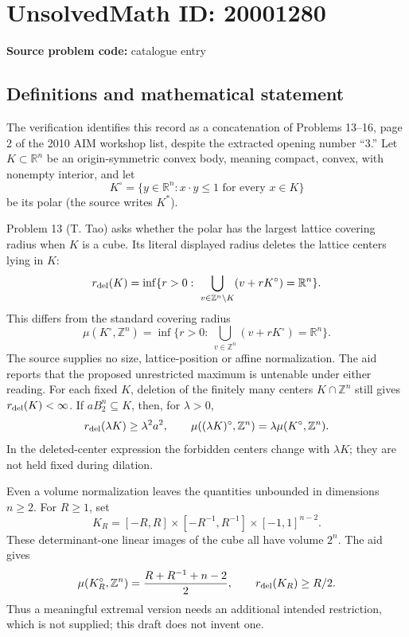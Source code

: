 \documentclass[11pt]{article}
\newcommand{\Z}{\mathbb{Z}}
\newcommand{\R}{\mathbb{R}}
\begin{document}
\section*{UnsolvedMath ID: 20001280}
\textbf{Source problem code:} catalogue entry
\subsection{Definitions and mathematical statement}
The verification identifies this record as a concatenation of Problems 13--16, page 2 of the 2010 AIM workshop list, despite the extracted opening number ``3.'' Let \(K\subset\R^n\) be an origin-symmetric convex body, meaning compact, convex, with nonempty interior, and let
\[
K^\circ=\{y\in\R^n:x\cdot y\le1\text{ for every }x\in K\}
\]
be its polar (the source writes \(K^*\)).

Problem 13 (T. Tao) asks whether the polar has the largest lattice covering radius when \(K\) is a cube. Its literal displayed radius deletes the lattice centers lying in \(K\):
\[
r_{\rm del}(K)=\inf\{r>0:\ \bigcup_{v\in\Z^n\setminus K}(v+rK^\circ)=\R^n\}.
\]
This differs from the standard covering radius
\[
\mu(K^\circ,\Z^n)=\inf\{r>0:\ \bigcup_{v\in\Z^n}(v+rK^\circ)=\R^n\}.
\]
The source supplies no size, lattice-position or affine normalization. The aid reports that the proposed unrestricted maximum is untenable under either reading. For each fixed \(K\), deletion of the finitely many centers \(K\cap\Z^n\) still gives \(r_{\rm del}(K)<\infty\). If \(aB_2^n\subseteq K\), then, for \(\lambda>0\),
\[
r_{\rm del}(\lambda K)\ge\lambda^2a^2,
\qquad
\mu((\lambda K)^\circ,\Z^n)=\lambda\mu(K^\circ,\Z^n).
\]
In the deleted-center expression the forbidden centers change with \(\lambda K\); they are not held fixed during dilation.

Even a volume normalization leaves the quantities unbounded in dimensions \(n\ge2\). For \(R\ge1\), set
\[
K_R=[-R,R]\times[-R^{-1},R^{-1}]\times[-1,1]^{n-2}.
\]
These determinant-one linear images of the cube all have volume \(2^n\). The aid gives
\[
\mu(K_R^\circ,\Z^n)=\frac{R+R^{-1}+n-2}{2},\qquad r_{\rm del}(K_R)\ge R/2.
\]
Thus a meaningful extremal version needs an additional intended restriction, which is not supplied; this draft does not invent one.
\end{document}
